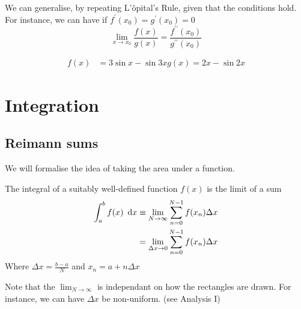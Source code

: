 \documentclass{article}
\begin{document}
We can generalise, by repeating L'\^opital's Rule, given that the conditions hold. For instance, we can have if $f^{\prime}(x_0) = g^{\prime}(x_0) = 0$
\[
    \lim_{x \rightarrow x_0}{\frac{f(x)}{g(x)}} = \frac{f^{\prime\prime}(x_0)}{g^{\prime\prime}(x_0)}
\]

\begin{eg}
    \begin{align*}
        f(x) &= 3\sin{x} - \sin{3x}
        g(x) = 2x - \sin{2x}
    \end{align*}
\end{eg}


\section{Integration}
\subsection{Reimann sums}
We will formalise the idea of taking the area under a function. 

\begin{defi}[Integral]
    The integral of a suitably well-defined function $f(x)$ is the limit of a sum
    \begin{align*}
        \int_{a}^{b}{f(x) \ \mathop{}\!\mathrm{d} x} &\equiv \lim_{N \rightarrow \infty}{\sum_{n=0}^{N-1}{f(x_n)\Delta x}} \\
        &= \lim_{\Delta x \rightarrow 0}{\sum_{n=0}^{N-1}{f(x_n)\Delta x}}
    \end{align*}
    Where $\Delta x = \frac{b - a}{N}$ and $x_n = a + n\Delta x$
    
    Note that the $\lim_{N \rightarrow \infty}$ is independant on how the rectangles are drawn. For instance, we can have $\Delta x$ be non-uniform. (see Analysis I)
\end{defi}
\end{document}
